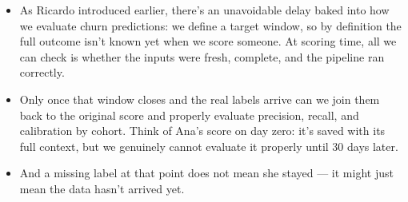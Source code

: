 \documentclass[11pt,a4paper]{article}
\begin{document}
\begin{examplebox}[title after break={SPOKEN SCRIPT --- slide 21 continued}]
\begin{itemize}
\item As Ricardo introduced earlier, there's an unavoidable delay baked into how we evaluate churn predictions: we define a target window, so by definition the full outcome isn't known yet when we score someone. At scoring time, all we can check is whether the inputs were fresh, complete, and the pipeline ran correctly.
\item Only once that window closes and the real labels arrive can we join them back to the original score and properly evaluate precision, recall, and calibration by cohort. Think of Ana's score on day zero: it's saved with its full context, but we genuinely cannot evaluate it properly until 30 days later.
\item And a missing label at that point does not mean she stayed — it might just mean the data hasn't arrived yet.
\end{itemize}
\end{examplebox}
\par\noindent{\scriptsize\textcolor{teal!60!black}{Reading anchor: Bass, Ch. 11 / §14.1.5 · Teaching 30-day window}}
\clearpage
\end{document}
